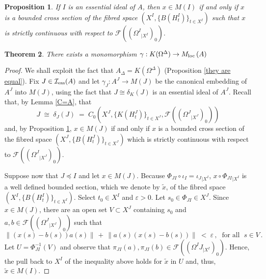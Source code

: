\documentclass{amsart}
\newtheorem{theorem}{Theorem}[section]
\newtheorem{proposition}[theorem]{Proposition}
\theoremstyle{definition}
\theoremstyle{remark}
\begin{document}
\begin{proposition}\label{mult alg} If $I$ is an essential ideal of $A$, then
$x\in M(I)$ if and only if
$x$ is a bounded cross
section of the fibred space $(X^I,\{B(H^I_t)\}_{t\in X^I})$ such that $x$
is strictly continuous with respect to ${\mathcal{F}}((\Omega^I{}_{\vert X^I})_0)$.
\end{proposition}

\begin{theorem}\label{k-omega} There exists a monomorphism $\gamma: K(\Omega^\Delta)\rightarrow {M_{\rm loc}\,}(A)$
\end{theorem}

\begin{proof} We shall exploit the fact that $A_\Delta=K(\Omega^\Delta)$ (Proposition \ref{they are equal}).
Fix
$J\in \mathcal I_{\rm ess}(A)$ and let
$\gamma_J:A^J\rightarrow M(J)$ be the canonical embedding of $A^J$ into $M(J)$,
using the fact that $J\cong\delta_K(J)$
is an essential ideal of $A^J$. Recall that, by Lemma \ref{C=A}, that
\[
J\;\cong\; \delta_J(J)\;=\;C_0 \left(X^J,\{K(H^J_t)\}_{t\in X^J},{\mathcal{F}}((\Omega^J{}_{\vert X^J})_0) \right)
\]
and, by Proposition \ref{mult alg},
$x\in M(J)$ if and only if $x$ is a bounded cross
section of the fibred space $(X^J,\{B(H^J_t)\}_{t\in X^J})$ which
is strictly continuous  with respect to ${\mathcal{F}}((\Omega^J{}_{\vert X^J})_0)$.

Suppose now that $J \preccurlyeq I$ and let $x\in M(J)$. Because $\Phi_{JI}\circ \iota_I=\iota_J{}_{|X^I}$, $x\circ\Phi_{JI}{}_{\vert X^I}$
is a well defined bounded section, which we denote by $\tilde x$, of the fibred space $(X^I,\{B(H^I_t)\}_{t\in X^I})$.
Select $t_0\in X^I$ and $\varepsilon>0$.
Let $s_0\in\Phi_{JI}\in X^J$. Since $x\in M(J)$,
there are an open set $V\subset X^J$ containing $s_0$ and $a,b\in {\mathcal{F}}((\Omega^J{}_{\vert X^J})_0) $ such that
\[
\|\left( x(s)-b(s)\right)a(s)\|\,+\,\|a(s)\left( x(s)-b(s)\right)\|\;<\;\varepsilon\,,\;\mbox{ for all }\;s\in V\,.
\]
Let $U=\Phi_{JI}^{-1}(V)$ and observe that $\pi_{JI}(a),\pi_{JI}(b)\in {\mathcal{F}}((\Omega^IJ{}_{\vert X^I})_0)$. Hence, the
pull back to $X^I$ of the inequality above holds for $\tilde x$ in $U$ and, thus, $\tilde x\in M(I)$.


\end{proof}
\end{document}
